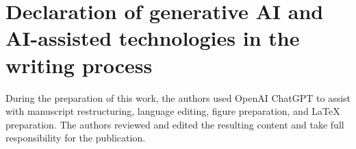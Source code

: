 \section*{Declaration of generative AI and AI-assisted technologies in the writing process}
During the preparation of this work, the authors used OpenAI ChatGPT to assist with manuscript restructuring, language editing, figure preparation, and LaTeX preparation. The authors reviewed and edited the resulting content and take full responsibility for the publication.
